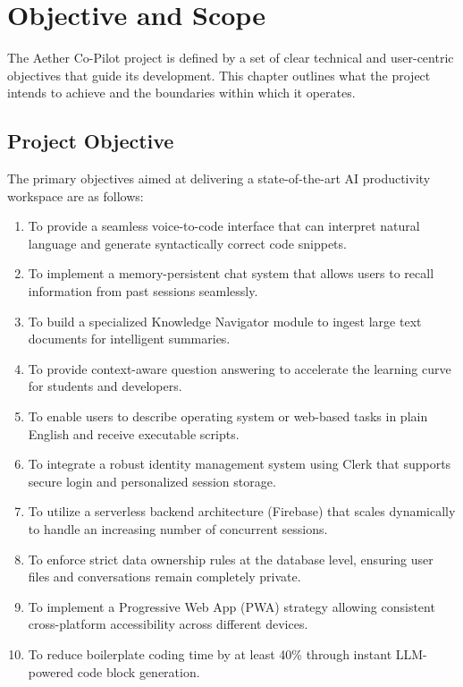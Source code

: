 \chapter{Objective and Scope}

The Aether Co-Pilot project is defined by a set of clear technical and user-centric objectives that guide its development. This chapter outlines what the project intends to achieve and the boundaries within which it operates.

\section{Project Objective}
The primary objectives aimed at delivering a state-of-the-art AI productivity workspace are as follows:
\begin{enumerate}
    \item To provide a seamless voice-to-code interface that can interpret natural language and generate syntactically correct code snippets.
    \item To implement a memory-persistent chat system that allows users to recall information from past sessions seamlessly.
    \item To build a specialized Knowledge Navigator module to ingest large text documents for intelligent summaries.
    \item To provide context-aware question answering to accelerate the learning curve for students and developers.
    \item To enable users to describe operating system or web-based tasks in plain English and receive executable scripts.
    \item To integrate a robust identity management system using Clerk that supports secure login and personalized session storage.
    \item To utilize a serverless backend architecture (Firebase) that scales dynamically to handle an increasing number of concurrent sessions.
    \item To enforce strict data ownership rules at the database level, ensuring user files and conversations remain completely private.
    \item To implement a Progressive Web App (PWA) strategy allowing consistent cross-platform accessibility across different devices.
    \item To reduce boilerplate coding time by at least 40\% through instant LLM-powered code block generation.
\end{enumerate}

